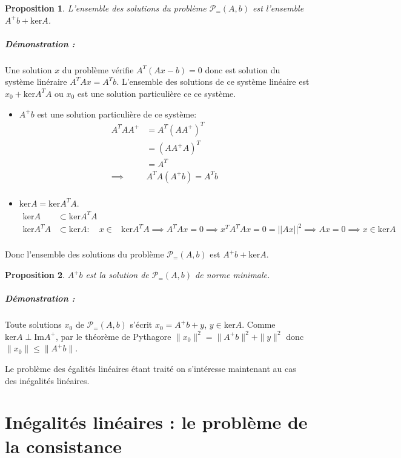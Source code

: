 \documentclass[10pt,a4paper]{article}
\newtheorem{prop}{Proposition}
\begin{document}
\begin{prop}
  L'ensemble des solutions du problème $\mathcal{P}_{=}(A, b)$ est l'ensemble $A^+b + \text{ker}A$.
\end{prop}
\subparagraph{Démonstration :}
  Une solution $x$ du problème vérifie $A^T(Ax-b)=0$ donc est solution du système linéraire $A^TAx = A^Tb$.
  L'ensemble des solutions de ce système linéaire est $x_0 + \text{ker}A^TA$ ou $x_0$ est une solution particulière ce ce système.
\begin{itemize}
  \item $A^+b$ est une solution particulière de ce système:
    \begin{equation}
    \begin{aligned}
      A^T A A^+ &= A^T (A A^+)^T \\
        &= (A A^+ A)^T\\
        &= A^T\\
      \implies &A^T A (A^+ b) = A^Tb\\
      \end{aligned}
    \end{equation}
  \item $\text{ker}A = \text{ker}A^TA$.
    \begin{equation}
    \begin{aligned}
      \text{ker}A &\subset \text{ker}A^TA\\
      \text{ker}A^TA &\subset \text{ker}A:\quad x \in &\text{ker}A^TA \implies A^TAx = 0 \implies x^TA^TAx = 0 = || Ax ||^2 \implies Ax = 0 \implies x \in \text{ker}A\\
      \end{aligned}
    \end{equation}
\end{itemize}
Donc l'ensemble des solutions du problème $\mathcal{P}_{=}(A, b)$ est $A^+b + \text{ker}A$.

\begin{prop}
  $A^+b$ est la solution de $\mathcal{P}_{=}(A, b)$ de norme minimale.
\end{prop}
\subparagraph{Démonstration :}
  Toute solutions $x_0$ de $\mathcal{P}_{=}(A, b)$ s'écrit $x_0 = A^+b + y$, $y \in \text{ker}A$.
  Comme $\text{ker}A \perp \text{Im}A^+$, par le théorème de Pythagore $\|x_0 \|^2= \|A^+b \|^2 + \| y \|^2$ donc $\|x_0\| \leq \|A^+b\|$.

Le problème des égalités linéaires étant traité on s'intéresse maintenant au cas des inégalités linéaires.

\section{Inégalités linéaires : le problème de la consistance}
\end{document}
